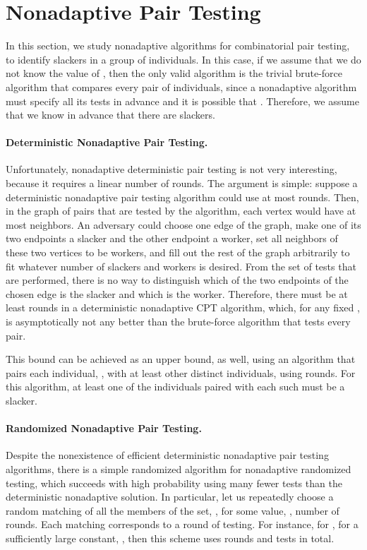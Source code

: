 \documentclass[11pt]{llncs}
\renewcommand{\subsection}[1]{\paragraph{\bf #1.}}
\begin{document}
 \section{Nonadaptive Pair Testing}
In this section, we study nonadaptive algorithms for combinatorial 
pair testing, to identify  slackers in a group of 
individuals. In this case, if we assume that we 
do not know the value of , then the only valid algorithm is the
trivial brute-force algorithm that compares every pair of individuals, since
a nonadaptive algorithm must specify all its tests in advance and it is
possible that .
Therefore, we assume that we know in advance that there are  slackers.

\subsection{Deterministic Nonadaptive Pair Testing}
Unfortunately,
nonadaptive deterministic pair testing is not very interesting,
because it requires a linear number of rounds.
The argument is simple: suppose a deterministic nonadaptive pair testing algorithm could use at most 
rounds. Then, in the graph of pairs that are tested by the algorithm,
each vertex would have at most  neighbors. An adversary could choose
one edge of the graph, make one of its two endpoints a slacker and the
other endpoint a worker, set all neighbors of these two vertices to be
workers, and fill out the rest of the graph arbitrarily to fit whatever
number of slackers and workers is desired.
From the set of tests that are performed, there is no way to distinguish
which of the two endpoints of the chosen edge is the slacker and which
is the worker.
Therefore, there must be at least  rounds in a
deterministic nonadaptive CPT algorithm, which, for any fixed ,
is asymptotically not any better than the brute-force algorithm that tests
every pair.

This bound can be achieved as an upper bound, as well, using an algorithm
that pairs each individual, , with at least  other distinct 
individuals, using  rounds. For this algorithm, at least one of the individuals
paired with each such  must be a slacker.

\subsection{Randomized Nonadaptive Pair Testing}
Despite the nonexistence of efficient deterministic nonadaptive pair testing algorithms, there is a simple randomized algorithm 
for nonadaptive randomized testing, which
succeeds with high probability using many fewer tests than the deterministic
nonadaptive solution.
In particular, let us repeatedly choose a random matching of all the
members of the set, , for some value, , 
number of rounds.
Each matching corresponds to a round of testing. 
For instance, for , for 
a sufficiently large constant, ,
then this scheme uses  rounds and
 tests in total.
\end{document}
